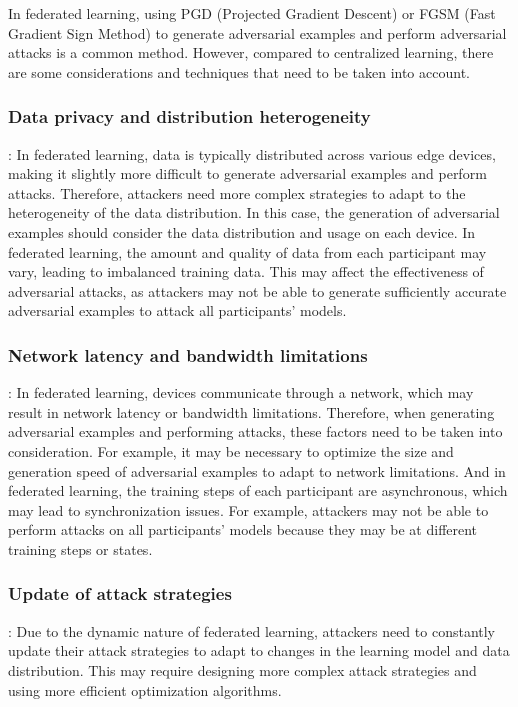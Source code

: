 \documentclass[conference]{IEEEtran}
\begin{document}
In federated learning, using PGD (Projected Gradient Descent) or FGSM
(Fast Gradient Sign Method) to generate adversarial examples and perform
adversarial attacks is a common method. However, compared to centralized
learning, there are some considerations and techniques that need to be
taken into account.

\subsubsection{Data privacy and distribution heterogeneity}: In federated learning, data is
typically distributed across various edge devices, making it slightly more
difficult to generate adversarial examples and perform attacks. Therefore,
attackers need more complex strategies to adapt to the heterogeneity of the
data distribution. In this case, the generation of adversarial examples should
consider the data distribution and usage on each device. In federated learning,
the amount and quality of data from each participant may vary, leading to
imbalanced training data. This may affect the effectiveness of adversarial attacks,
as attackers may not be able to generate sufficiently accurate adversarial
examples to attack all participants' models.

\subsubsection{Network latency and bandwidth limitations}: In federated learning,
devices communicate through a network, which may result in network
latency or bandwidth limitations. Therefore, when generating adversarial
examples and performing attacks, these factors need to be taken into
consideration. For example, it may be necessary to optimize the size
and generation speed of adversarial examples to adapt to network limitations.
And in federated learning, the training steps of each participant are asynchronous,
which may lead to synchronization issues. For example, attackers may not be able
to perform attacks on all participants' models because they may be at
different training steps or states.

\subsubsection{Update of attack strategies}: Due to the dynamic nature of federated
learning, attackers need to constantly update their attack strategies
to adapt to changes in the learning model and data distribution. This
may require designing more complex attack strategies and using more
efficient optimization algorithms.
\end{document}
